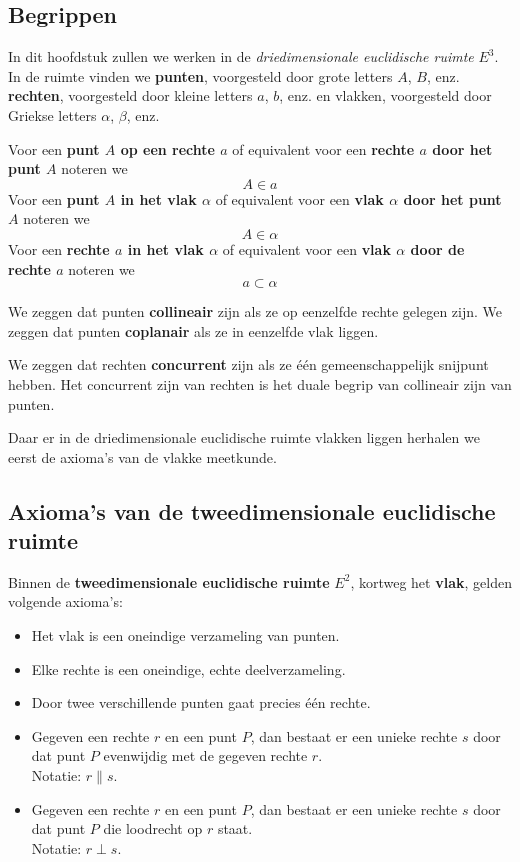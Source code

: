 \documentclass[12pt,twoside]{article}
\begin{document}
\begin{theorie}

\subsection{Begrippen}

In dit hoofdstuk zullen we werken in de {\em driedimensionale euclidische ruimte} $E^3$. In de ruimte vinden we {\bf punten}, voorgesteld door grote letters $A$, $B$, enz. {\bf rechten}, voorgesteld door kleine letters $a$, $b$, enz. en vlakken, voorgesteld door Griekse letters $\alpha$, $\beta$, enz.

Voor een {\bf punt $A$ op een rechte $a$} of equivalent voor een {\bf rechte $a$ door het punt $A$} noteren we $$A\in a$$
Voor een {\bf punt $A$ in het vlak $\alpha$} of equivalent voor een {\bf vlak $\alpha$ door het punt $A$} noteren we $$A\in \alpha$$
Voor een {\bf rechte $a$ in het vlak $\alpha$} of equivalent voor een {\bf vlak $\alpha$ door de rechte $a$} noteren we $$a\subset \alpha$$

We zeggen dat punten {\bf collineair} zijn als ze op eenzelfde rechte gelegen zijn. We zeggen dat punten {\bf coplanair} als ze in eenzelfde vlak liggen.

We zeggen dat rechten {\bf concurrent} zijn als ze één gemeenschappelijk snijpunt hebben. Het concurrent zijn van rechten is het duale begrip van collineair zijn van punten.

Daar er in de driedimensionale euclidische ruimte vlakken liggen herhalen we eerst de axioma's van de vlakke meetkunde.

\subsection{Axioma's van de tweedimensionale euclidische ruimte}

Binnen de {\bf tweedimensionale euclidische ruimte} $E^2$, kortweg het {\bf vlak}, gelden volgende axioma's:
\begin{itemize}
  \item Het vlak is een oneindige verzameling van punten.
  \item Elke rechte is een oneindige, echte deelverzameling.
  \item Door twee verschillende punten gaat precies één rechte.
  \item Gegeven een rechte $r$ en een punt $P$, dan bestaat er een unieke rechte $s$ door dat punt $P$ evenwijdig met de gegeven rechte $r$.\\
  Notatie: $r\parallel s$.
  \item Gegeven een rechte $r$ en een punt $P$, dan bestaat er een unieke rechte $s$ door dat punt $P$ die loodrecht op $r$ staat.\\
  Notatie: $r\perp s$.
\end{itemize}


\end{theorie}
\end{document}
